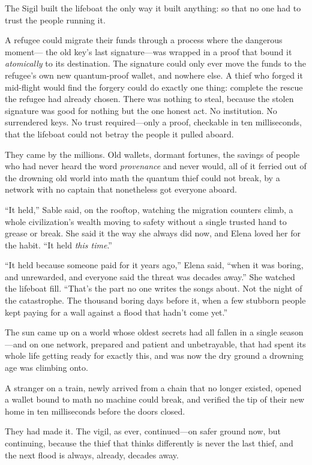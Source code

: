 \documentclass[12pt,letterpaper]{book}
\begin{document}
The Sigil built the lifeboat the only way it built anything: so that no one had to
trust the people running it.

A refugee could migrate their funds through a process where the dangerous moment---
the old key's last signature---was wrapped in a proof that bound it
\emph{atomically} to its destination. The signature could only ever move the funds
to the refugee's own new quantum-proof wallet, and nowhere else. A thief who forged
it mid-flight would find the forgery could do exactly one thing: complete the rescue
the refugee had already chosen. There was nothing to steal, because the stolen
signature was good for nothing but the one honest act. No institution. No
surrendered keys. No trust required---only a proof, checkable in ten milliseconds,
that the lifeboat could not betray the people it pulled aboard.

They came by the millions. Old wallets, dormant fortunes, the savings of people who
had never heard the word \emph{provenance} and never would, all of it ferried out
of the drowning old world into math the quantum thief could not break, by a network
with no captain that nonetheless got everyone aboard.

``It held,'' Sable said, on the rooftop, watching the migration counters climb, a
whole civilization's wealth moving to safety without a single trusted hand to grease
or break. She said it the way she always did now, and Elena loved her for the habit.
``It held \emph{this time}.''

``It held because someone paid for it years ago,'' Elena said, ``when it was
boring, and unrewarded, and everyone said the threat was decades away.'' She
watched the lifeboat fill. ``That's the part no one writes the songs about. Not the
night of the catastrophe. The thousand boring days before it, when a few stubborn
people kept paying for a wall against a flood that hadn't come yet.''

The sun came up on a world whose oldest secrets had all fallen in a single season
---and on one network, prepared and patient and unbetrayable, that had spent its
whole life getting ready for exactly this, and was now the dry ground a drowning
age was climbing onto.

A stranger on a train, newly arrived from a chain that no longer existed, opened a
wallet bound to math no machine could break, and verified the tip of their new home
in ten milliseconds before the doors closed.

They had made it. The vigil, as ever, continued---on safer ground now, but
continuing, because the thief that thinks differently is never the last thief, and
the next flood is always, already, decades away.
\end{document}
